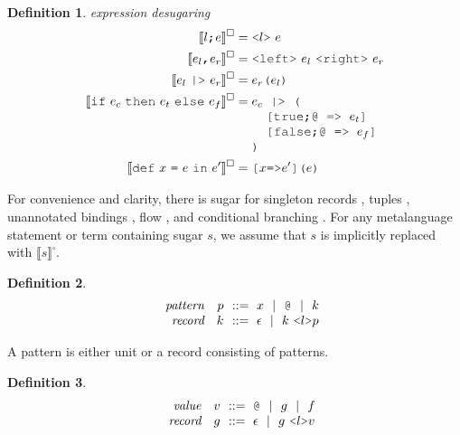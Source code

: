 \documentclass[acmsmall]{acmart}
\theoremstyle{definition}
\newtheorem{definition}{Definition}[section]
\begin{document}
\begin{definition} 
  \label{def:expression_desugaring}
  \emph{expression desugaring}
  \hfill
  \small
  \nopad
  \begin{align*}
      \llbracket l \J{;} e \rrbracket^\square &= \J{<}l \J{>}\ e
      \\
      \llbracket e_l \J{,} e_r \rrbracket^\square &= \J{<left>}\ e_l \ \J{<right>}\ e_r
      \\
      \llbracket e_l\ \J{|>}\ e_r \rrbracket^\square &= e_r\J{(}e_l\J{)}
      \\
      \llbracket \J{if}\ e_c\ \J{then}\ e_t\ \J{else}\ e_f \rrbracket^\square &= 
      \begin{array}[t]{@{} l}
        e_c \J{ |> (}
          \\
          \I \J{[true;@ => } e_t \J{]}
          \\
          \I \J{[false;@ => } e_f \J{]}
          \\
        \J{)}
      \end{array}
      \\
      \llbracket \J{def}\ x\ \J{=}\ e\ \J{in}\ e' \rrbracket^\square &= \J{[}x \J{=>} e'\J{]}\J{(}e\J{)}
  \end{align*}

\end{definition} 

\noindent
For convenience and clarity, there is sugar for 
singleton records ,
tuples , 
unannotated bindings , flow ,
and conditional branching .
For any metalanguage statement or term containing sugar $s$, we assume that $s$ is implicitly replaced with $\llbracket s \rrbracket^\square$.

\begin{definition}
  \label{def:pattern}
  \small
  \nopad
  \[\begin{array}[t]{rr@{}l}
    \com{pattern} &
    \nonterm{p} & \is 
      x \sep
      \J{@} \sep
      k
    \\
    \com{record} &
    \nonterm{k} & \is \epsilon \sep k\ \J{<}l\J{>}p
  \end{array}\]
\end{definition}

\noindent
A pattern is either unit or a record consisting of patterns.

\begin{definition}
  \label{def:value}
  \small
  \nopad
  \[\begin{array}[t]{rr@{}l}
    \com{value} &
    \nonterm{v} & \is 
      \J{@} \sep
      g \sep
      f
    \\
    \com{record} &
    \nonterm{g} & \is \epsilon \sep g\ \J{<}l\J{>}v
  \end{array}\]
\end{definition}
\end{document}
